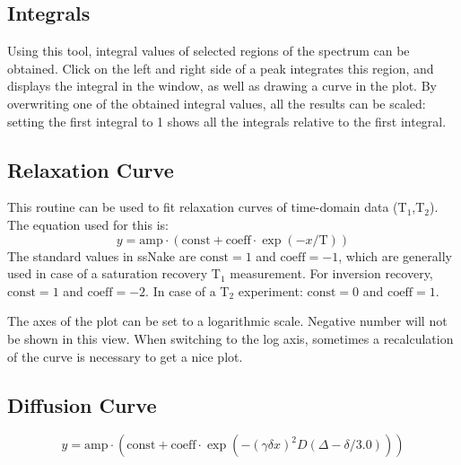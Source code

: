 \documentclass[11pt,a4paper]{article}
\begin{document}
\subsection{Integrals}
Using this tool, integral values of selected regions of the spectrum can be obtained. Click on the
left and right side of a peak integrates this region, and displays the integral in the window, as
well as drawing a curve in the plot. By overwriting one of the obtained integral values, all the
results can be scaled: setting the first integral to 1 shows all the integrals relative to the first
integral.

\subsection{Relaxation Curve}
This routine can be used to fit relaxation curves of time-domain data (T$_1$,T$_2$). The equation
used for this is:
\begin{equation}
  y = \text{amp} \cdot (\text{const} + \text{coeff} \cdot \exp(-x/\text{T}))
\end{equation}
The standard values in ssNake are $\text{const} = 1$ and $\text{coeff} = -1$, which are generally
used in case of a saturation recovery T$_1$ measurement. For inversion recovery,  $\text{const} = 1$
and $\text{coeff} = -2$. In case of a T$_2$ experiment:  $\text{const} = 0$
and $\text{coeff} = 1$.

The axes of the plot can be set to a logarithmic scale. Negative number will not be shown in this
view. When switching to the log axis, sometimes a recalculation of the curve is necessary to get a
nice plot.

\subsection{Diffusion Curve}
\begin{equation}
   y = \text{amp} \cdot (\text{const} + \text{coeff} \cdot \exp(-(\gamma  \delta  x)^2  D  (\Delta -\delta / 3.0)))
\end{equation}
\end{document}
